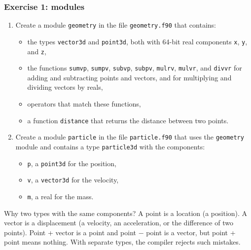 \begin{frame}
  \frametitle{Exercise 1: modules}
  \begin{enumerate}
    \item Create a module \texttt{geometry} in the file \texttt{geometry.f90} that contains:
      \begin{itemize}
        \item the types \texttt{vector3d} and \texttt{point3d}, both with 64-bit real components \texttt{x}, \texttt{y}, and \texttt{z},
        \item the functions \texttt{sumvp}, \texttt{sumpv}, \texttt{subvp}, \texttt{subpv}, \texttt{mulrv}, \texttt{mulvr}, and \texttt{divvr} for adding and subtracting points and vectors, and for multiplying and dividing vectors by reals,
        \item operators that match these functions,
        \item a function \texttt{distance} that returns the distance between two points.
      \end{itemize}
    \item Create a module \texttt{particle} in the file \texttt{particle.f90} that uses the \texttt{geometry} module and contains a type \texttt{particle3d} with the components:
      \begin{itemize}
        \item \texttt{p}, a \texttt{point3d} for the position,
        \item \texttt{v}, a \texttt{vector3d} for the velocity,
        \item \texttt{m}, a real for the mass.
      \end{itemize}
  \end{enumerate}

  \begin{block}{Why two types with the same components?}
    A point is a location (a position). A vector is a displacement (a velocity, an acceleration, or the difference of two points). Point + vector is a point and point $-$ point is a vector, but point + point means nothing. With separate types, the compiler rejects such mistakes.
  \end{block}
\end{frame}


